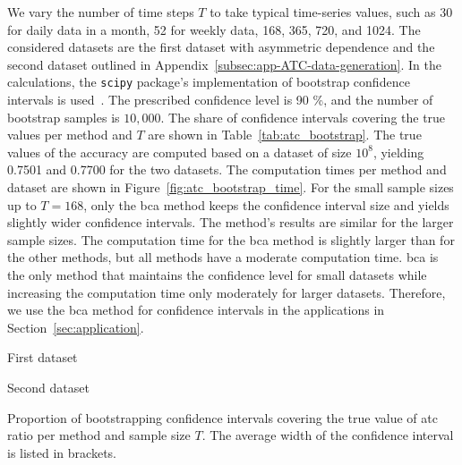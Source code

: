 \documentclass[pdflatex]{sn-jnl}
\theoremstyle{plain}%
\theoremstyle{definition}
\begin{document}
We vary the number of time steps $T$ to take typical time-series values, such as 30 for daily data in a month, 52 for weekly data, 168, 365, 720, and 1024.
The considered datasets are the first dataset with asymmetric dependence and the second dataset outlined in Appendix~\ref{subsec:app-ATC-data-generation}.
In the calculations, the \verb|scipy| package's implementation of bootstrap confidence intervals is used~\citep{Virtanen2020}.
The prescribed confidence level is 90 \%, and the number of bootstrap samples is $10,000$.
The share of confidence intervals covering the true values per method and $T$ are shown in Table~\ref{tab:atc_bootstrap}.
The true values of the accuracy are computed based on a dataset of size $10^8$, yielding 0.7501 and 0.7700 for the two datasets.
The computation times per method and dataset are shown in Figure~\ref{fig:atc_bootstrap_time}.
For the small sample sizes up to $T = 168$, only the \ac{bca} method keeps the confidence interval size and yields slightly wider confidence intervals.
The method's results are similar for the larger sample sizes.
The computation time for the \ac{bca} method is slightly larger than for the other methods, but all methods have a moderate computation time.
\Ac{bca} is the only method that maintains the confidence level for small datasets while increasing the computation time only moderately for larger datasets.
Therefore, we use the \ac{bca} method for confidence intervals in the applications in Section~\ref{sec:application}.


\begin{table}
    \centering
    \tiny
    \begin{subtable}{.48\textwidth}
       \centering
        
        \caption{First dataset}
    \end{subtable}\hspace{0.02\textwidth}
    \begin{subtable}{.48\textwidth}
       \centering
       
        \caption{Second dataset}
    \end{subtable}
    \caption[Proportion of bootstrapping confidence intervals covering the true value of \ac{atc} ratio per method and sample size $T$ in the bootstrap simulation study.]{Proportion of bootstrapping confidence intervals covering the true value of \ac{atc} ratio per method and sample size $T$. The average width of the confidence interval is listed in brackets.}
    \label{tab:atc_bootstrap}
\end{table}
\end{document}
